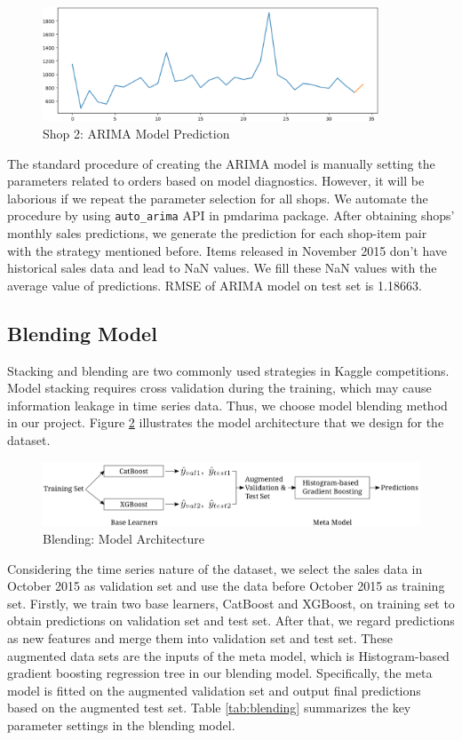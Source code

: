 \documentclass{article}
\begin{document}
\begin{figure}[!ht]
    \centering
    \includegraphics[width=10cm]{./figs/arima-2.png}
    \caption{Shop 2: ARIMA Model Prediction}
    \label{fig:arima-2}
\end{figure}

The standard procedure of creating the ARIMA model is manually setting the parameters related to orders based on model diagnostics. However, it will be laborious if we repeat the parameter selection for all shops. We automate the procedure by using \texttt{auto\_arima} API in pmdarima package. After obtaining shops' monthly sales predictions, we generate the prediction for each shop-item pair with the strategy mentioned before. Items released in November 2015 don't have historical sales data and lead to NaN values. We fill these NaN values with the average value of predictions. RMSE of ARIMA model on test set is 1.18663.

\subsection{Blending Model} \label{method}
Stacking and blending are two commonly used strategies in Kaggle competitions. Model stacking requires cross validation during the training, which may cause information leakage in time series data. Thus, we choose model blending method in our project. Figure \ref{fig:blending} illustrates the model architecture that we design for the dataset.

\begin{figure}[!ht]
    \centering
    \includegraphics[width=16cm]{./figs/blending.png}
    \caption{Blending: Model Architecture}
    \label{fig:blending}
\end{figure}

Considering the time series nature of the dataset, we select the sales data in October 2015 as validation set and use the data before October 2015 as training set. Firstly, we train two base learners, CatBoost and XGBoost, on training set to obtain predictions on validation set and test set. After that, we regard predictions as new features and merge them into validation set and test set. These augmented data sets are the inputs of the meta model, which is Histogram-based gradient boosting regression tree in our blending model. Specifically, the meta model is fitted on the augmented validation set and output final predictions based on the augmented test set. Table \ref{tab:blending} summarizes the key parameter settings in the blending model. \par
\end{document}
